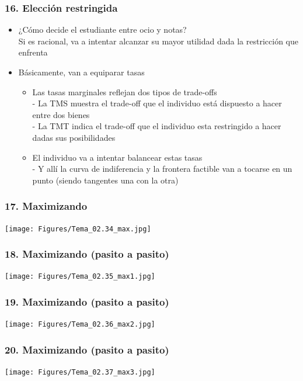 \documentclass[14pt]{beamer}
\begin{document}
\begin{frame}
\frametitle{16. Elección restringida}
\begin{itemize}
    \item ¿Cómo decide el estudiante entre ocio y notas? \\
    Si es racional, va a intentar alcanzar su mayor utilidad dada la restricción que enfrenta
    \item Básicamente, van a equiparar tasas
        \begin{itemize}
        \item Las tasas marginales reflejan dos tipos de trade-offs \\ 
        - La TMS muestra el trade-off que el individuo está dispuesto a hacer entre dos bienes \\ 
        - La TMT indica el trade-off que el individuo esta restringido a hacer dadas sus posibilidades
        \item El individuo va a intentar balancear estas tasas \\
        - Y allí la curva de indiferencia y la frontera factible van a tocarse en un punto (siendo tangentes una con la otra)
        \end{itemize}
\end{itemize} 
\end{frame}

\begin{frame}
\frametitle{17. Maximizando}
\centering
\texttt{[image: Figures/Tema\_02.34\_max.jpg]}
\end{frame}

\begin{frame}
\frametitle{18. Maximizando (pasito a pasito)}
\centering
\texttt{[image: Figures/Tema\_02.35\_max1.jpg]}
\end{frame}

\begin{frame}
\frametitle{19. Maximizando (pasito a pasito)}
\centering
\texttt{[image: Figures/Tema\_02.36\_max2.jpg]}
\end{frame}

\begin{frame}
\frametitle{20. Maximizando (pasito a pasito)}
\centering
\texttt{[image: Figures/Tema\_02.37\_max3.jpg]}
\end{frame}
\end{document}
